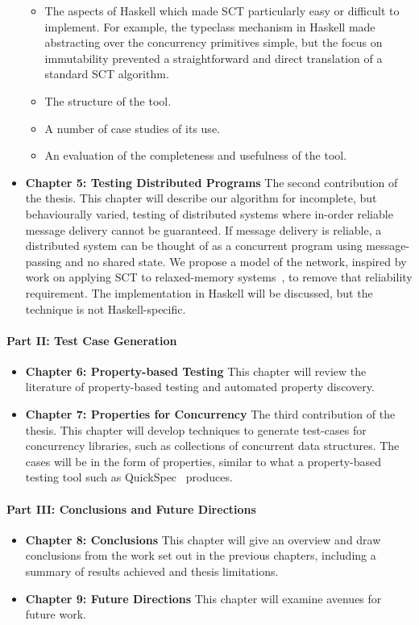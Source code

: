 \documentclass{article}
\begin{document}
\begin{itemize}
  \begin{itemize}
  \item The aspects of Haskell which made SCT particularly easy or
    difficult to implement. For example, the typeclass mechanism in
    Haskell made abstracting over the concurrency primitives simple,
    but the focus on immutability prevented a straightforward and
    direct translation of a standard SCT algorithm.
  \item The structure of the tool.
  \item A number of case studies of its use.
  \item An evaluation of the completeness and usefulness of the tool.
  \end{itemize}

\item \textbf{Chapter 5: Testing Distributed Programs} The second
  contribution of the thesis. This chapter will describe our algorithm
  for incomplete, but behaviourally varied, testing of distributed
  systems where in-order reliable message delivery cannot be
  guaranteed. If message delivery is reliable, a distributed system
  can be thought of as a concurrent program using message-passing and
  no shared state. We propose a model of the network, inspired by work
  on applying SCT to relaxed-memory systems~\cite{zhang2015}, to
  remove that reliability requirement. The implementation in Haskell
  will be discussed, but the technique is not Haskell-specific.
\end{itemize}

\paragraph{Part II: Test Case Generation}
\begin{itemize}
\item \textbf{Chapter 6: Property-based Testing} This chapter will
  review the literature of property-based testing and automated
  property discovery.

\item \textbf{Chapter 7: Properties for Concurrency} The third
  contribution of the thesis. This chapter will develop techniques to
  generate test-cases for concurrency libraries, such as collections
  of concurrent data structures. The cases will be in the form of
  properties, similar to what a property-based testing tool such as
  QuickSpec~\cite{claessen2010} produces.
\end{itemize}

\paragraph{Part III: Conclusions and Future Directions}
\begin{itemize}
\item \textbf{Chapter 8: Conclusions} This chapter will give an
  overview and draw conclusions from the work set out in the previous
  chapters, including a summary of results achieved and thesis
  limitations.
\item \textbf{Chapter 9: Future Directions} This chapter will
  examine avenues for future work.
\end{itemize}
\end{document}
